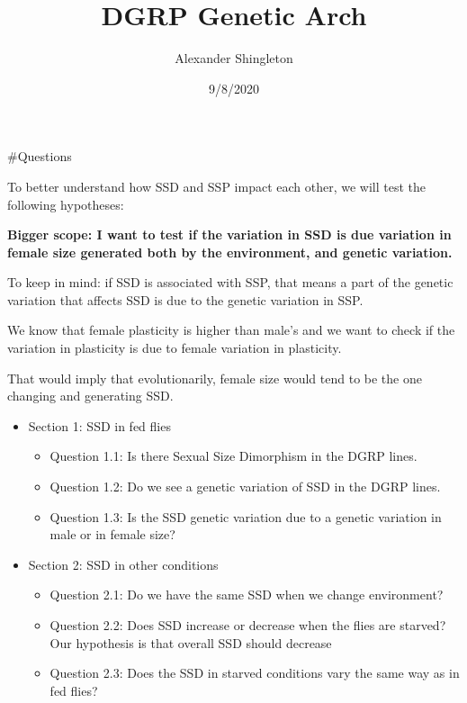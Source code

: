\documentclass[
]{article}
\title{DGRP Genetic Arch}
\author{Alexander Shingleton}
\date{9/8/2020}
\providecommand{\tightlist}{%
  \setlength{\itemsep}{0pt}\setlength{\parskip}{0pt}}
\begin{document}
\maketitle

\#Questions

To better understand how SSD and SSP impact each other, we will test the
following hypotheses:

\textbf{Bigger scope: I want to test if the variation in SSD is due
variation in female size generated both by the environment, and genetic
variation.}

To keep in mind: if SSD is associated with SSP, that means a part of the
genetic variation that affects SSD is due to the genetic variation in
SSP.

We know that female plasticity is higher than male's and we want to
check if the variation in plasticity is due to female variation in
plasticity.

That would imply that evolutionarily, female size would tend to be the
one changing and generating SSD.

\begin{itemize}
\tightlist
\item
  Section 1: SSD in fed flies

  \begin{itemize}
  \tightlist
  \item
    Question 1.1: Is there Sexual Size Dimorphism in the DGRP lines.
  \item
    Question 1.2: Do we see a genetic variation of SSD in the DGRP
    lines.
  \item
    Question 1.3: Is the SSD genetic variation due to a genetic
    variation in male or in female size?
  \end{itemize}
\item
  Section 2: SSD in other conditions

  \begin{itemize}
  \tightlist
  \item
    Question 2.1: Do we have the same SSD when we change environment?
  \item
    Question 2.2: Does SSD increase or decrease when the flies are
    starved? Our hypothesis is that overall SSD should decrease
  \item
    Question 2.3: Does the SSD in starved conditions vary the same way
    as in fed flies?
  \end{itemize}
\end{itemize}
\end{document}

